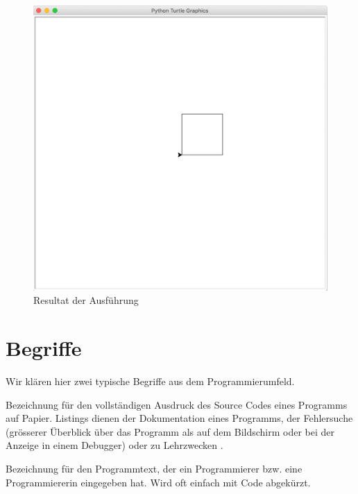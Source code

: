 \begin{example}
\begin{figure}[htb]
\centering
\includegraphics[scale=0.3]{quadrat.png}
\caption{Resultat der Ausführung}
\label{figure-quadrat}
\end{figure}

\end{example}

\section{Begriffe}

Wir klären hier zwei typische Begriffe aus dem Programmierumfeld.

\begin{definition}
Bezeichnung für den vollständigen Ausdruck des Source Codes eines Programms auf Papier. Listings dienen der Dokumentation eines Programms, der Fehlersuche (grösserer Überblick über das Programm als auf dem Bildschirm oder bei der Anzeige in einem Debugger) oder zu Lehrzwecken \cite{def-listing}.
\end{definition}

\begin{definition}
Bezeichnung für den Programmtext, der ein Programmierer bzw. eine Programmiererin eingegeben hat. Wird oft einfach mit Code abgekürzt.
\end{definition}

